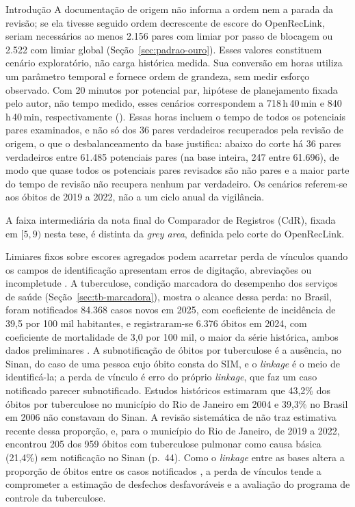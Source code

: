 \begin{chapter}{Introdução}
A documentação de origem não informa a ordem nem a parada da revisão; se ela tivesse seguido ordem decrescente de escore do OpenRecLink, seriam necessários ao menos 2.156 pares com limiar por passo de blocagem ou 2.522 com limiar global (Seção~\ref{sec:padrao-ouro}). Esses valores constituem cenário exploratório, não carga histórica medida. Sua conversão em horas utiliza um parâmetro temporal e fornece ordem de grandeza, sem medir esforço observado. Com 20 minutos por potencial par, hipótese de planejamento fixada pelo autor, não tempo medido, esses cenários correspondem a 718\,h\,40\,min e 840\,h\,40\,min, respectivamente (). Essas horas incluem o tempo de todos os potenciais pares examinados, e não só dos 36 pares verdadeiros recuperados pela revisão de origem, o que o desbalanceamento da base justifica: abaixo do corte há 36 pares verdadeiros entre 61.485 potenciais pares (na base inteira, 247 entre 61.696), de modo que quase todos os potenciais pares revisados são não pares e a maior parte do tempo de revisão não recupera nenhum par verdadeiro. Os cenários referem-se aos óbitos de 2019 a 2022, não a um ciclo anual da vigilância.

A faixa intermediária da nota final do Comparador de Registros (CdR), fixada em $[5,9)$ nesta tese, é distinta da \textit{grey area}, definida pelo corte do OpenRecLink.

Limiares fixos sobre escores agregados podem acarretar perda de vínculos quando os campos de identificação apresentam erros de digitação, abreviações ou incompletude \cite{Christen2012book}. A tuberculose, condição marcadora do desempenho dos serviços de saúde (Seção~\ref{sec:tb-marcadora}), mostra o alcance dessa perda: no Brasil, foram notificados 84.368 casos novos em 2025, com coeficiente de incidência de 39,5 por 100 mil habitantes, e registraram-se 6.376 óbitos em 2024, com coeficiente de mortalidade de 3,0 por 100 mil, o maior da série histórica, ambos dados preliminares \cite{Brasil2026tb}. A subnotificação de óbitos por tuberculose é a ausência, no Sinan, do caso de uma pessoa cujo óbito consta do SIM, e o \textit{linkage} é o meio de identificá-la; a perda de vínculo é erro do próprio \textit{linkage}, que faz um caso notificado parecer subnotificado. Estudos históricos estimaram que 43,2\% dos óbitos por tuberculose no município do Rio de Janeiro em 2004 \cite{Sousa2011obitos} e 39,3\% no Brasil em 2006 \cite{Oliveira2012uso} não constavam do Sinan. A revisão sistemática de  não traz estimativa recente dessa proporção, e, para o município do Rio de Janeiro, de 2019 a 2022,  encontrou 205 dos 959 óbitos com tuberculose pulmonar como causa básica (21,4\%) sem notificação no Sinan (p.~44). Como o \textit{linkage} entre as bases altera a proporção de óbitos entre os casos notificados \cite{Oliveira2012uso,Bartholomay2014improved}, a perda de vínculos tende a comprometer a estimação de desfechos desfavoráveis e a avaliação do programa de controle da tuberculose.


\end{chapter}
